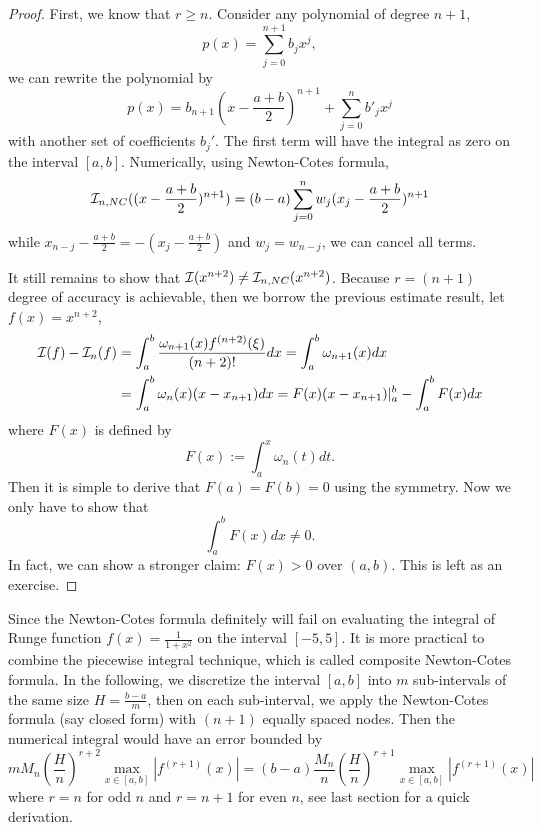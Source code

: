 \begin{proof}
    First, we know that $r\ge n$. Consider any polynomial of degree $n+1$, 
    \begin{equation}
        p(x) = \sum_{j=0}^{n+1} b_j x^j, 
    \end{equation}
    we can rewrite the polynomial by 
    \begin{equation}
        p(x) = b_{n+1} (x - \frac{a+b}{2})^{n+1} + \sum_{j=0}^n b'_j x^j 
    \end{equation}
    with another set of coefficients $b_j'$. The first term will have the integral as zero on the interval $[a, b]$. Numerically, using Newton-Cotes formula, 
    \begin{equation}
        \mathcal I_{n, NC}( (x - \frac{a+b}{2})^{n+1}  ) = (b-a)\sum_{j=0}^n w_j  (x_j - \frac{a+b}{2})^{n+1}
    \end{equation}
    while $x_{n-j} -  \frac{a+b}{2} = -(x_j -  \frac{a+b}{2}) $ and $w_j = w_{n-j}$, we can cancel all terms. 

    It still remains to show that $\mathcal I(x^{n+2})\neq \mathcal I_{n,NC}(x^{n+2})$. Because $r= (n+1)$ degree of accuracy is achievable, then we borrow the previous estimate result, let $f(x) = x^{n+2}$, 
    \begin{equation}
        \begin{aligned}
            \mathcal I(f) - \mathcal I_n(f) &= \int_a^b \frac{\omega_{n+1}(x) f^{(n+2)}(\xi)}{(n+2)!} dx = \int_a^b \omega_{n+1}(x) dx \\
            &=     \int_a^b \omega_n(x) (x - x_{n+1}) dx = F(x) (x - x_{n+1})|_a^b - \int_a^b F(x) dx  
        \end{aligned}
    \end{equation}
    where $F(x)$ is defined by 
    $$F(x) := \int_a^x \omega_{n}(t) dt. $$ Then it is simple to derive that $F(a) = F(b) = 0$ using the symmetry. Now we only have to show that 
    $$\int_a^b F(x)dx \neq 0.$$
    In fact, we can show a stronger claim: $F(x)>  0$ over $(a, b)$. This is left as an exercise.
\end{proof}
Since the Newton-Cotes formula definitely will fail on evaluating the integral of Runge function $f(x) = \frac{1}{1+x^2}$ on the interval $[-5,5]$. It is more practical to combine the piecewise integral technique, which is called composite Newton-Cotes formula. In the following, we discretize the interval $[a, b]$ into $m$ sub-intervals of the same size $H = \frac{b-a}{m}$, then on each sub-interval, we apply the Newton-Cotes formula (say closed form) with $(n+1)$ equally spaced nodes. Then the numerical integral would have an error bounded by 
\begin{equation}
    m M_n \left(\frac{H}{n}\right)^{r+2} \max_{x\in[a, b]}|f^{(r+1)}(x)| =     (b-a) \frac{M_n}{n} \left(\frac{H}{n}\right)^{r+1} \max_{x\in[a, b]}|f^{(r+1)}(x)|
\end{equation}
where $r = n$ for odd $n$ and $r = n+1$ for even $n$, see last section for a quick derivation.


